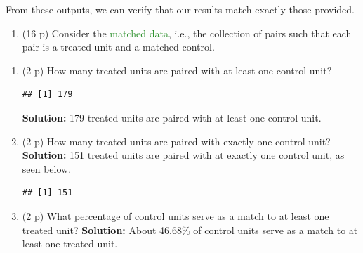 \documentclass[
]{article}
\newenvironment{Shaded}{\begin{snugshade}}{\end{snugshade}}
\newcommand{\DecValTok}[1]{\textcolor[rgb]{0.00,0.00,0.81}{#1}}
\newcommand{\FunctionTok}[1]{\textcolor[rgb]{0.13,0.29,0.53}{\textbf{#1}}}
\newcommand{\NormalTok}[1]{#1}
\newcommand{\OtherTok}[1]{\textcolor[rgb]{0.56,0.35,0.01}{#1}}
\newcommand{\SpecialCharTok}[1]{\textcolor[rgb]{0.81,0.36,0.00}{\textbf{#1}}}
\providecommand{\tightlist}{%
  \setlength{\itemsep}{0pt}\setlength{\parskip}{0pt}}
\begin{document}
From these outputs, we can verify that our results match exactly those
provided.

\begin{enumerate}
\def\labelenumi{\arabic{enumi}.}
\setcounter{enumi}{6}
\tightlist
\item
  (16 p) Consider the \textcolor{ForestGreen}{matched data}, i.e., the
  collection of pairs such that each pair is a treated unit and a
  matched control.
\end{enumerate}

\begin{enumerate}
\def\labelenumi{\alph{enumi}.}
\item
  (2 p) How many treated units are paired with at least one control
  unit?

\begin{Shaded}
\end{Shaded}

\begin{verbatim}
## [1] 179
\end{verbatim}

  \textbf{Solution:} 179 treated units are paired with at least one
  control unit.
\item
  (2 p) How many treated units are paired with exactly one control unit?
  \newline \textbf{Solution:} 151 treated units are paired with at
  exactly one control unit, as seen below.

\begin{Shaded}
\end{Shaded}

\begin{verbatim}
## [1] 151
\end{verbatim}
\item
  (2 p) What percentage of control units serve as a match to at least
  one treated unit? \newline \textbf{Solution:} About 46.68\% of control
  units serve as a match to at least one treated unit.


\end{enumerate}
\end{document}
